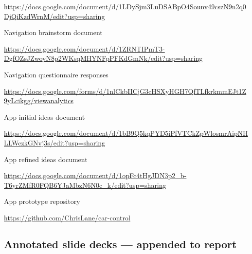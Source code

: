 \documentclass{article}
\begin{document}
\url{https://docs.google.com/document/d/1LDySjm3LuDSABpO4Sounv49cszN9n2q0DjQiKzdWrnM/edit?usp=sharing}

\noindent
Navigation brainstorm document

\url{https://docs.google.com/document/d/1ZRNTIPmT3-DgfOZsJZwoyN8p2WKsqMHYNFpPFKdGmNk/edit?usp=sharing}

\noindent
Navigation questionnaire responses

\url{https://docs.google.com/forms/d/1nlCkbIICjG3cHSXyHGH7QfTLfkrkmmEJt1Z9yLcikgg/viewanalytics}

\noindent
App initial ideas document

\url{https://docs.google.com/document/d/1bB9Q5kqPYD5iPfVTCkZpWlosmrAipNHLLWczkGNvj3s/edit?usp=sharing}

\noindent
App refined ideas document

\url{https://docs.google.com/document/d/1opFc4tHgJDN3p2_b-T6yrZMfR0FQB6YJaMbzN6N0c_k/edit?usp=sharing}

\noindent
App prototype repository

\url{https://github.com/ChrisLane/car-control}

\subsection{Annotated slide decks --- appended to report}\label{ssec:appendix-other}

%

%
%
%
%
%
%
%
%
%
%
%
%
%
%
%
%
%
%
%
%
%
%
%
%
%
%
%
%
%
%
%
%
%
%
%
\end{document}
